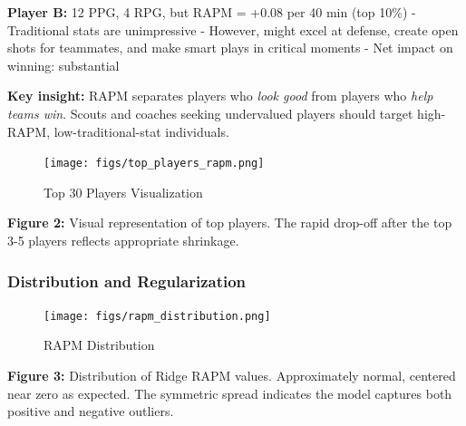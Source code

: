 \documentclass[
  letterpaper,
  DIV=11,
  numbers=noendperiod]{scrartcl}
\begin{document}
\textbf{Player B:} 12 PPG, 4 RPG, but RAPM = +0.08 per 40 min (top 10\%)
- Traditional stats are unimpressive - However, might excel at defense,
create open shots for teammates, and make smart plays in critical
moments - Net impact on winning: substantial

\textbf{Key insight:} RAPM separates players who \emph{look good} from
players who \emph{help teams win}. Scouts and coaches seeking
undervalued players should target high-RAPM, low-traditional-stat
individuals.

\begin{figure}[H]

{\centering \texttt{[image: figs/top\_players\_rapm.png]}

}

\caption{Top 30 Players Visualization}

\end{figure}%

\textbf{Figure 2:} Visual representation of top players. The rapid
drop-off after the top 3-5 players reflects appropriate shrinkage.

\subsubsection{Distribution and
Regularization}\label{distribution-and-regularization}

\begin{figure}[H]

{\centering \texttt{[image: figs/rapm\_distribution.png]}

}

\caption{RAPM Distribution}

\end{figure}%

\textbf{Figure 3:} Distribution of Ridge RAPM values. Approximately
normal, centered near zero as expected. The symmetric spread indicates
the model captures both positive and negative outliers.
\end{document}
